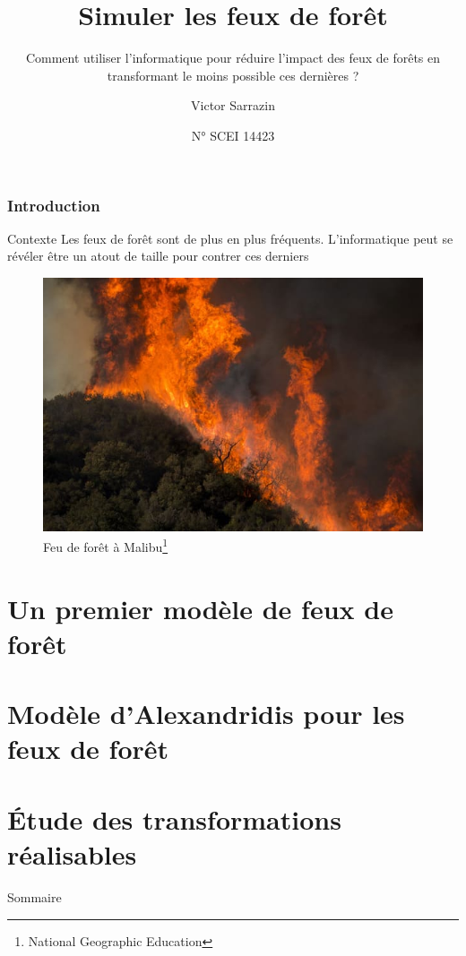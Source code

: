 \documentclass{beamer}
\title{Simuler les feux de forêt}
\subtitle{Comment utiliser l'informatique pour réduire l'impact des feux de forêts en transformant le moins possible ces dernières ?}
\author{Victor Sarrazin}
\date{N° SCEI 14423}
\begin{document}
\begin{frame}[plain]

    \titlepage

\end{frame}

\begin{frame}
    \frametitle{Introduction \hyperlink{jump}{\beamerbutton{ }} \hypertarget{1}{\beamerbutton{ }}}

    \begin{block}{Contexte}
        Les feux de forêt sont de plus en plus fréquents. L'informatique peut se révéler être un atout de taille pour contrer ces derniers
    \end{block}

    \begin{figure}
        \centering
        \includegraphics[width=0.5\linewidth]{pictures/intro.jpg}
        \caption{Feu de forêt à Malibu\footnote{National Geographic Education}}
        \label{fig:enter-label}
    \end{figure}
\end{frame}


\section{Un premier modèle de feux de forêt}
\section{Modèle d'Alexandridis pour les feux de forêt}
\section{Étude des transformations réalisables}

\begin{frame}{Sommaire \hyperlink{jump}{\beamerbutton{ }} \hypertarget{2}{\beamerbutton{ }}}
    \tableofcontents
\end{frame}
\end{document}
